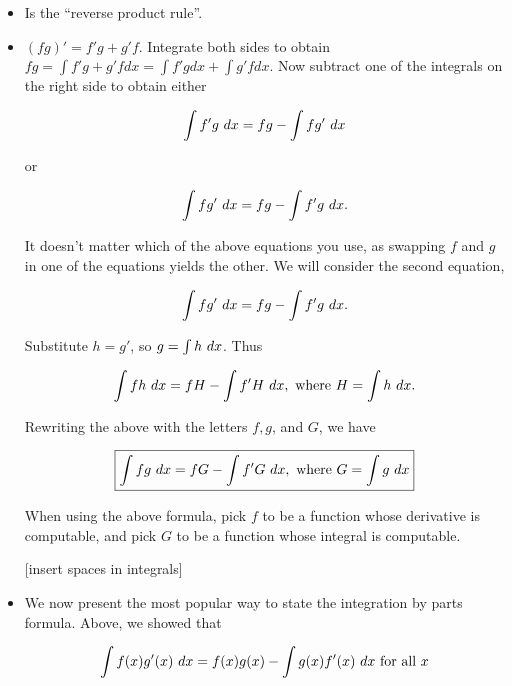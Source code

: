 \begin{itemize}
    \item Is the ``reverse product rule''.
    \item $(fg)' = f'g + g'f$. Integrate both sides to obtain $fg = \int f'g + g'f dx = \int f'g dx + \int g'f dx$. Now subtract one of the integrals on the right side to obtain either
    
    \begin{align*}
        \int f'g \text{ } dx = fg - \int fg' \text{ } dx
    \end{align*}
    
    or
    
    \begin{align*}
        \int fg' \text{ } dx = fg - \int f'g \text{ } dx.
    \end{align*}
    
    It doesn't matter which of the above equations you use, as swapping $f$ and $g$ in one of the equations yields the other. We will consider the second equation,
    
    \begin{align*}
        \int fg' \text{ } dx = fg - \int f'g \text{ } dx.
    \end{align*}
    
    Substitute $h = g'$, so $g = \int h \text{ } dx$. Thus
    
    \begin{align*}
        \int fh \text{ } dx = fH - \int f'H \text{ } dx, \text{ where } H = \int h \text{ } dx.
    \end{align*}
    
    Rewriting the above with the letters $f, g$, and $G$, we have
    
    \begin{align*}
        \boxed
        {
            \int fg \text{ } dx = fG - \int f'G \text{ } dx, \text{ where } G = \int g \text{ } dx
        }
    \end{align*}
    
    When using the above formula, pick $f$ to be a function whose derivative is computable, and pick $G$ to be a function whose integral is computable.
    
    [insert spaces in integrals]
    
    \item We now present the most popular way to state the integration by parts formula. Above, we showed that

    \begin{align*}
        \int f(x) g'(x) \text{ } dx = f(x) g(x) - \int g(x) f'(x) \text{ } dx \text{ for all $x$}
    \end{align*}


\end{itemize}
